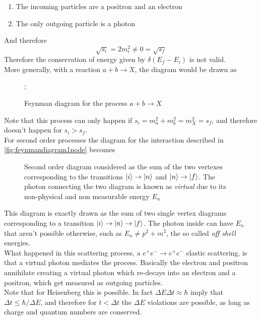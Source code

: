 \documentclass[../qm.tex]{subfiles}
\begin{document}
\begin{enumerate}
\item The incoming particles are a positron and an electron
\item The only outgoing particle is a photon
\end{enumerate}
And therefore
\begin{equation*}
	\sqrt{s_i}=2m_e^2\ne0=\sqrt{s_f}
\end{equation*}
Therefore the conservation of energy given by $\delta(E_f-E_i)$ is not valid.\\
More generally, with a reaction $a+b\to X$, the diagram would be drawn as
\begin{figure}[H]
	\centering
	;
	\caption{Feynman diagram for the process $a+b\to X$}
	\label{fig:feynmanabX}
\end{figure}
Note that this process can only happen if $s_i=m_a^2+m_b^2=m_X^2=s_f$, and therefore doesn't happen for $s_i>s_f$.\\
For second order processes the diagram for the interaction described in \eqref{fig:feynmandiagram1node} becomes
\begin{figure}[H]
	\centering
	\caption{Second order diagram considered as the sum of the two vertexes corresponding to the transitions $\ket{i}\to\ket{n}$ and $\ket{n}\to\ket{f}$. The photon connecting the two diagram is known as \emph{virtual} due to its non-physical and non measurable energy $E_n$}
	\label{fig:2ndorderfeynman}
\end{figure}
This diagram is exactly drawn as the sum of two single vertex diagrams corresponding to a transition $\ket{i}\to\ket{n}\to\ket{f}$. The photon inside can have $E_n$ that aren't possible otherwise, such as $E_n\ne p^2+m^2$, the so called \emph{off shell} energies.\\
What happened in this scattering process, a $e^+e^-\to e^+e^-$ elastic scattering, is that a virtual photon mediates the process. Basically the electron and positron annihilate creating a virtual photon which re-decays into an electron and a positron, which get measured as outgoing particles.\\
Note that for Heisenberg this is possible. In fact $\Delta E\Delta t\approx\hbar$ imply that $\Delta t\le\hbar/\Delta E$, and therefore for $t<\Delta t$ the $\Delta E$ violations are possible, as long as charge and quantum numbers are conserved.
\end{document}
